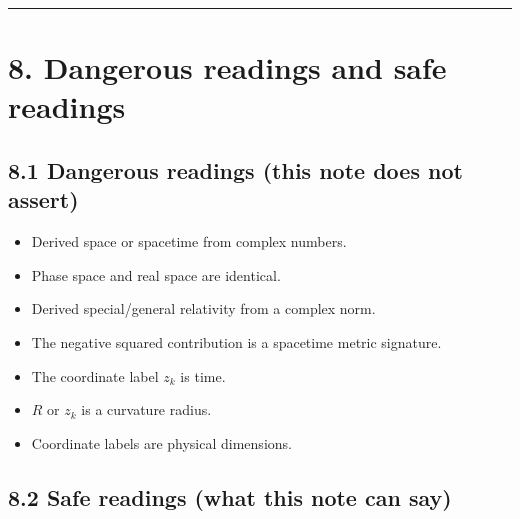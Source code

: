 \documentclass[11pt,a4paper]{article}
\providecommand{\tightlist}{\setlength{\itemsep}{0pt}\setlength{\parskip}{0pt}}
\begin{document}
\begin{center}\rule{0.5\linewidth}{0.5pt}\end{center}

\section{8. Dangerous readings and safe
readings}\label{dangerous-readings-and-safe-readings}

\subsection{8.1 Dangerous readings (this note does not
assert)}\label{dangerous-readings-this-note-does-not-assert}

\begin{itemize}
\tightlist
\item
  Derived space or spacetime from complex numbers.
\item
  Phase space and real space are identical.
\item
  Derived special/general relativity from a complex norm.
\item
  The negative squared contribution is a spacetime metric signature.
\item
  The coordinate label \(z_k\) is time.
\item
  \(R\) or \(z_k\) is a curvature radius.
\item
  Coordinate labels are physical dimensions.
\end{itemize}

\subsection{8.2 Safe readings (what this note can
say)}\label{safe-readings-what-this-note-can-say}
\end{document}
